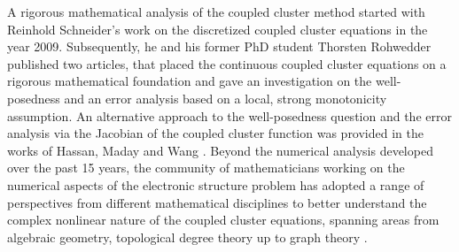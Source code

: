 \documentclass[reqno]{amsart}
\begin{document}
\newline
A rigorous mathematical analysis of the coupled cluster method started with Reinhold Schneider's work \cite{Schneider2009} on the discretized coupled cluster equations in the year 2009. Subsequently, he and his former PhD student Thorsten Rohwedder published two articles\cite{rohwedder1,rohwedder2}, that placed the continuous coupled cluster equations on a rigorous mathematical foundation and gave an investigation on the well-posedness and an error analysis based on a local, strong monotonicity assumption. An alternative approach to the well-posedness question and the error analysis via the Jacobian of the coupled cluster function was provided in the works of Hassan, Maday and Wang \cite{hassan2023analysissinglereferencecoupled,hassan2025analysissinglereferencecoupled}. Beyond the numerical analysis developed over the past 15 years, the community of mathematicians working on the numerical aspects of the electronic structure problem has adopted a range of perspectives from different mathematical disciplines to better understand the complex nonlinear nature of the coupled cluster equations, spanning areas from algebraic geometry, topological degree theory up to graph theory \cite{faulstich2024algebraicvarietiesquantumchemistry,Faulstich,Csirik_2023,Csirik_part2}.\\
\newline
\end{document}
